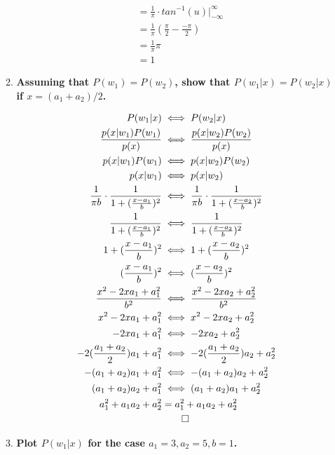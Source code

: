 \documentclass[12pt]{article}
\begin{document}
\begin{enumerate}
\begin{enumerate}
\begin{figure}[H]
\begin{equation}
\begin{split}
      & = \frac{1}{\pi} \cdot tan^{-1}(u) |_{-\infty}^{\infty} \\
      & = \frac{1}{\pi} (\frac{\pi}{2} - \frac{-\pi}{2}) \\
      & = \frac{1}{\pi} \pi \\
      & \boxed{= 1}
    \end{split}
    \end{equation}
    \end{figure}
  \item \textbf{Assuming that $P(w_1) = P(w_2)$, show that $P(w_1|x) = P(w_2|x)$ if $x = (a_1 + a_2)/2$.}
    \begin{figure}[H]
    \begin{equation}
    \begin{split}
      P(w_1|x)& \iff P(w_2|x) \\
      \frac{p(x|w_1)P(w_1)}{p(x)}& \iff \frac{p(x|w_2)P(w_2)}{p(x)} \\
      p(x|w_1)P(w_1)& \iff p(x|w_2)P(w_2) \\
      p(x|w_1)& \iff p(x|w_2) \\
      \frac{1}{\pi b} \cdot \frac{1}{1 + (\frac{x-a_1}{b})^2}& \iff \frac{1}{\pi b} \cdot \frac{1}{1 + (\frac{x-a_2}{b})^2} \\
      \frac{1}{1 + (\frac{x-a_1}{b})^2}& \iff \frac{1}{1 + (\frac{x-a_2}{b})^2} \\
      1 + (\frac{x-a_1}{b})^2& \iff 1 + (\frac{x-a_2}{b})^2 \\
      (\frac{x-a_1}{b})^2& \iff (\frac{x-a_2}{b})^2 \\
      \frac{x^2-2xa_1+a_1^2}{b^2}& \iff \frac{x^2-2xa_2+a_2^2}{b^2} \\
      x^2-2xa_1+a_1^2& \iff x^2-2xa_2+a_2^2 \\
      -2xa_1+a_1^2& \iff -2xa_2+a_2^2 \\
      -2(\frac{a_1+a_2}{2})a_1 + a_1^2& \iff -2(\frac{a_1+a_2}{2})a_2 + a_2^2 \\
      -(a_1+a_2)a_1 + a_1^2& \iff -(a_1+a_2)a_2 + a_2^2 \\
      (a_1+a_2)a_2 + a_1^2& \iff (a_1+a_2)a_1 + a_2^2 \\
      a_1^2+ a_1a_2 + a_2^2 & = a_1^2+ a_1a_2 + a_2^2 \\
      & \qed
    \end{split}
    \end{equation}
    \end{figure}
  \item \textbf{Plot $P(w_1|x)$ for the case $a_1=3, a_2=5, b=1$.}

\end{enumerate}
\end{enumerate}
\end{document}
